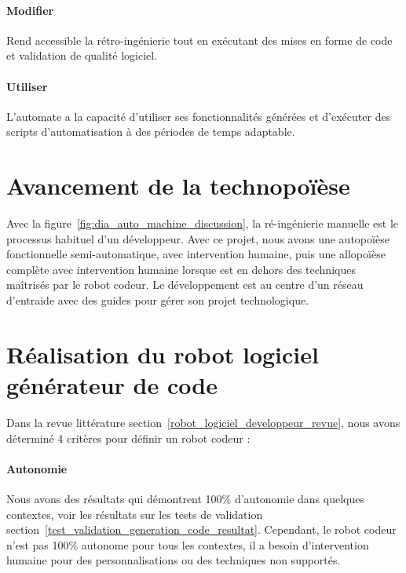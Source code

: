 \paragraph{Modifier}
Rend accessible la rétro-ingénierie tout en exécutant des mises en forme de code et validation de qualité logiciel.

\paragraph{Utiliser}
L’automate a la capacité d’utiliser ses fonctionnalités générées et d’exécuter des scripts d’automatisation à des périodes de temps adaptable.



\section{Avancement de la technopoïèse}
Avec la figure~\ref{fig:dia_auto_machine_discussion}, la ré-ingénierie manuelle est le processus habituel d'un développeur. Avec ce projet, nous avons une autopoïèse fonctionnelle semi-automatique, avec intervention humaine, puis une allopoïèse complète avec intervention humaine lorsque est en dehors des techniques maîtrisés par le robot codeur. Le développement est au centre d'un réseau d'entraide avec des guides pour gérer son projet technologique.

\section{Réalisation du robot logiciel générateur de code}
Dans la revue littérature section~\ref{robot_logiciel_developpeur_revue}, nous avons déterminé 4 critères pour définir un robot codeur :
\paragraph{Autonomie}
Nous avons des résultats qui démontrent 100\% d'autonomie dans quelques contextes, voir les résultats sur les tests de validation section~\ref{test_validation_generation_code_resultat}. Cependant, le robot codeur n'est pas 100\% autonome pour tous les contextes, il a besoin d'intervention humaine pour des personnalisations ou des techniques non supportés.


